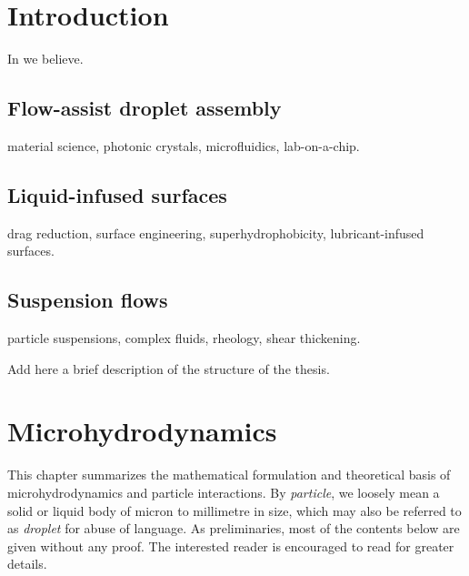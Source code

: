 \graphicspath{{imgs/}}

\chapter{Introduction}



In \cite{Batchelor} we believe.



\section{Flow-assist droplet assembly}

material science,
photonic crystals,
microfluidics,
lab-on-a-chip.


\section{Liquid-infused surfaces}

drag reduction,
surface engineering,
superhydrophobicity,
lubricant-infused surfaces.


\section{Suspension flows}

particle suspensions,
complex fluids,
rheology,
shear thickening.

\thesisstructure Add here a brief description of the structure of the thesis.



\chapter{Microhydrodynamics}


This chapter summarizes the mathematical formulation and theoretical basis of microhydrodynamics and particle interactions.
By \emph{particle}, we loosely mean a solid or liquid body of micron to millimetre in size, which may also be referred to as \emph{droplet} for abuse of language.
As preliminaries, most of the contents below are given without any proof. The interested reader is encouraged to read \cite{Batchelor, hb, ps, graham_2018} for greater details.

